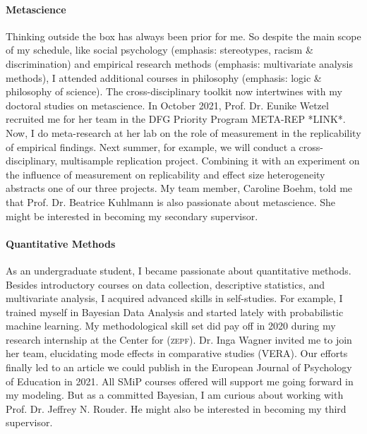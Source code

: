 \documentclass[10pt]{FreemanML}
\begin{document}

\paragraph{Metascience}

Thinking outside the box has always been prior for me. So despite the main
scope of my schedule, like social psychology (emphasis: stereotypes, racism \&
discrimination) and empirical research methods (emphasis: multivariate analysis
methods), I attended additional courses in philosophy (emphasis: logic \&
philosophy of science). The cross-disciplinary toolkit now intertwines with my
doctoral studies on metascience. In October 2021, Prof. Dr. Eunike Wetzel
recruited me for her team in the DFG Priority Program META-REP *LINK*. Now, I
do meta-research at her lab on the role of measurement in the replicability of
empirical findings. Next summer, for example, we will conduct a
cross-disciplinary, multisample replication project. Combining it with an
experiment on the influence of measurement on replicability and effect size
heterogeneity abstracts one of our three projects. My team member, Caroline
Boehm, told me that Prof. Dr. Beatrice Kuhlmann is also passionate about
metascience. She might be interested in becoming my secondary supervisor.

\paragraph{Quantitative Methods}

As an undergraduate student, I became passionate about quantitative methods.
Besides introductory courses on data collection, descriptive statistics, and
multivariate analysis, I acquired advanced skills in self-studies. For example,
I trained myself in Bayesian Data Analysis and started lately with
probabilistic machine learning. My methodological skill set did pay off in 2020
during my research internship at the Center for (\textsc{zepf}). Dr. Inga
Wagner invited me to join her team, elucidating mode effects in comparative
studies (VERA). Our efforts finally led to an article we could publish in the
European Journal of Psychology of Education in 2021. All SMiP courses offered
will support me going forward in my modeling. But as a committed Bayesian, I am
curious about working with Prof. Dr. Jeffrey N. Rouder. He might also be
interested in becoming my third supervisor.
\end{document}
